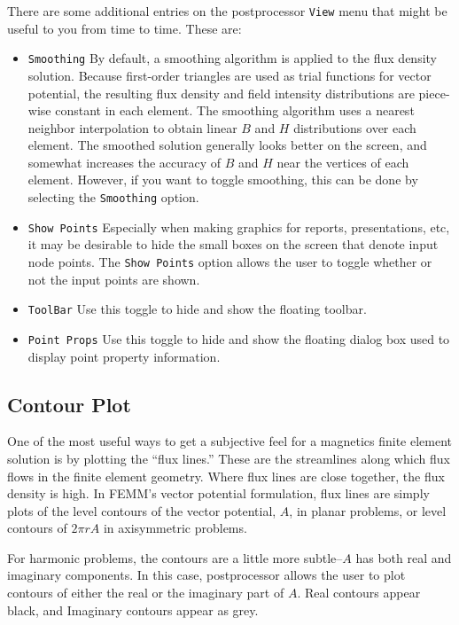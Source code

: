 \documentclass[12pt]{report}
\begin{document}
There are some additional entries on the postprocessor {\tt View}
menu that might be useful to you from time to time.  These are:
\begin{itemize}
\item {\tt Smoothing} By default, a smoothing algorithm is applied
to the flux density solution.  Because first-order triangles are
used as trial functions for vector potential, the resulting flux
density and field intensity distributions are piece-wise constant
in each element.  The smoothing algorithm uses a nearest neighbor
interpolation to obtain linear $B$ and $H$ distributions over each
element.  The smoothed solution generally looks better on the
screen, and somewhat increases the accuracy of $B$ and $H$ near the
vertices of each element.  However, if you want to toggle
smoothing, this can be done by selecting the {\tt Smoothing}
option.
\item {\tt Show Points}  Especially when making graphics for
reports, presentations, etc, it may be desirable to hide the small
boxes on the screen that denote input node points.  The {\tt Show
Points} option allows the user to toggle whether or not the input
points are shown.
\item {\tt ToolBar} Use this toggle to hide and show the floating
toolbar.
\item {\tt Point Props} Use this toggle to hide and show the
floating dialog box used to display point property information.
\end{itemize}


\subsection{Contour Plot}

One of the most useful ways to get a subjective feel for a
magnetics finite element solution is by plotting the ``flux
lines.''  These are the streamlines along which flux flows in the
finite element geometry.  Where flux lines are close together, the
flux density is high.  In FEMM's vector potential formulation, flux
lines are simply plots of the level contours of the vector
potential, $A$, in planar problems, or level contours of $2
\pi r A$ in axisymmetric problems.

For harmonic problems, the contours are a little more subtle--$A$
has both real and imaginary components.  In this case,
postprocessor allows the user to plot contours of either the real
or the imaginary part of $A$.  Real contours appear black, and
Imaginary contours appear as grey.
\end{document}
